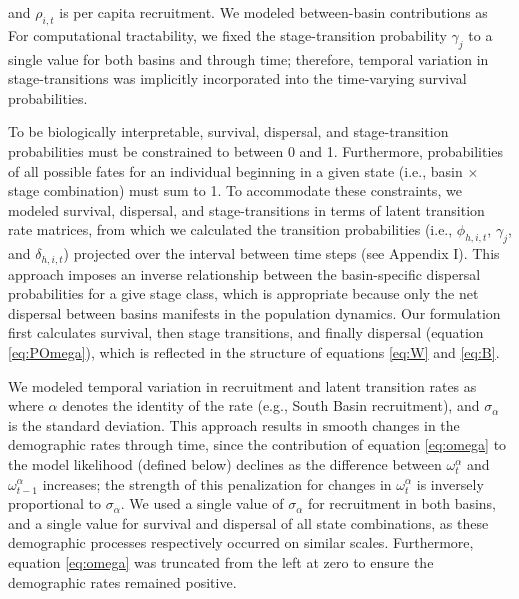 \documentclass[11pt]{article}
\begin{document}
and $\rho_{i,t}$ is per capita recruitment.
We modeled between-basin contributions as
%
%
%
For computational tractability,
we fixed the stage-transition probability $\gamma_{j}$ to a single value
for both basins and through time;
therefore, temporal variation in stage-transitions was implicitly incorporated
into the time-varying survival probabilities.

To be biologically interpretable,
survival, dispersal, and stage-transition probabilities must be constrained to between
0 and 1.
Furthermore,
probabilities of all possible fates for an individual beginning in a given state
(i.e., basin $\times$ stage combination) must sum to 1.
To accommodate these constraints,
we modeled survival, dispersal, and stage-transitions
in terms of latent transition rate matrices,
from which we calculated the transition probabilities
(i.e., $\phi_{h,i,t}$, $\gamma_{j}$, and $\delta_{h,i,t}$)
projected over the interval between time steps (see Appendix I).
This approach imposes an inverse relationship between
the basin-specific dispersal probabilities for a give stage class,
which is appropriate because only the net dispersal between basins manifests
in the population dynamics.
Our formulation first calculates survival, then stage transitions, and finally dispersal
(equation \ref{eq:POmega}),
which is reflected in the structure of equations \ref{eq:W} and \ref{eq:B}.

We modeled temporal variation in recruitment and latent transition rates as
%
%
where $\alpha$ denotes the identity of the rate (e.g., South Basin recruitment),
and $\sigma_{\alpha}$ is the standard deviation.
This approach results in smooth changes in the demographic rates through time,
since the contribution of equation \ref{eq:omega} to the model likelihood (defined below)
declines as the difference between $\omega^{\alpha}_t$ and $\omega^{\alpha}_{t-1}$
increases;
the strength of this penalization for changes in $\omega^{\alpha}_t$
is inversely proportional to $\sigma_{\alpha}$.
We used a single value of $\sigma_{\alpha}$ for recruitment in both basins,
and a single value for survival and dispersal of all state combinations,
as these demographic processes respectively occurred on similar scales.
Furthermore, equation \ref{eq:omega} was truncated from the left at zero to ensure the
demographic rates remained positive.
\end{document}
